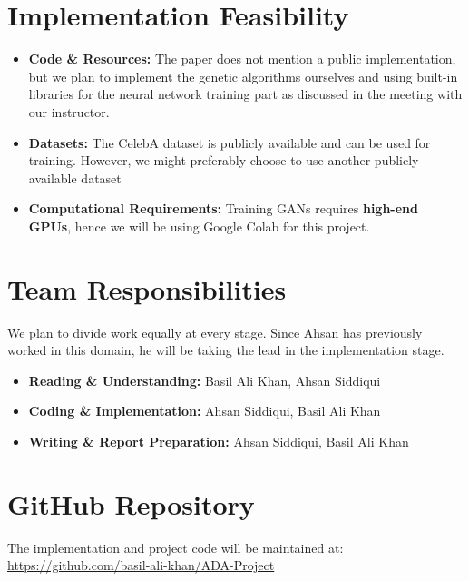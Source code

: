 \documentclass[a4paper,12pt]{article}
\begin{document}
\section*{Implementation Feasibility}
\begin{itemize}
    \item \textbf{Code \& Resources:} The paper does not mention a public implementation, but we plan to implement the genetic algorithms ourselves and using built-in libraries for the neural network training part as discussed in the meeting with our instructor.
    \item \textbf{Datasets:} The CelebA dataset is publicly available and can be used for training. However, we might preferably choose to use another publicly available dataset
    \item \textbf{Computational Requirements:} Training GANs requires \textbf{high-end GPUs}, hence we will be using Google Colab for this project.
\end{itemize}

\section*{Team Responsibilities}
We plan to divide work equally at every stage. Since Ahsan has previously worked in this domain, he will be taking the lead in the implementation stage. 
\begin{itemize}
    \item \textbf{Reading \& Understanding:} Basil Ali Khan, Ahsan Siddiqui
    \item \textbf{Coding \& Implementation:} Ahsan Siddiqui, Basil Ali Khan
    \item \textbf{Writing \& Report Preparation:} Ahsan Siddiqui, Basil Ali Khan
\end{itemize}

\section*{GitHub Repository}
The implementation and project code will be maintained at:  
\href{https://github.com/basil-ali-khan/ADA-Project}{https://github.com/basil-ali-khan/ADA-Project}
\end{document}
